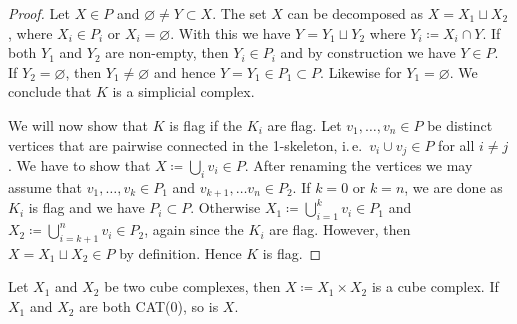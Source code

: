 \begin{proof}
  Let \(X \in P\) and \(\varnothing \neq Y \subset X\). The set \(X\) can be decomposed as \(X = X_1 \sqcup X_2\), where \(X_i \in P_i\) or \(X_i = \varnothing\). With this we have \(Y = Y_1 \sqcup Y_2\) where \(Y_i \coloneqq X_i \cap Y\). If both \(Y_1\) and \(Y_2\) are non-empty, then \(Y_i \in P_i\) and by construction we have \(Y \in P\). If \(Y_2 = \varnothing\), then \(Y_1 \neq \varnothing\) and hence \(Y = Y_1 \in P_1 \subset P\). Likewise for \(Y_1 = \varnothing\). We conclude that \(K\) is a simplicial complex.

  We will now show that \(K\) is flag if the \(K_i\) are flag. Let \(v_1, \dots, v_n \in P\) be distinct vertices that are pairwise connected in the 1-skeleton, i.\,e.\ \(v_i \cup v_j \in P\) for all \(i \neq j\). We have to show that \(X \coloneqq \bigcup_i v_i \in P\). After renaming the vertices we may assume that \(v_1, \dots, v_k \in P_1\) and \(v_{k+1}, \dots v_{n} \in P_2\). If \(k=0\) or \(k=n\), we are done as \(K_i\) is flag and we have \(P_i \subset P\). Otherwise \(X_1 \coloneqq \bigcup_{i=1}^kv_i \in P_1\) and \(X_2 \coloneqq \bigcup_{i=k+1}^n v_i \in P_2\), again since the \(K_i\) are flag. However, then \(X = X_1 \sqcup X_2 \in P\) by definition. Hence \(K\) is flag.
\end{proof}

\begin{prop}
  \label{prop:product-cat}
  Let \(X_1\) and \(X_2\) be two cube complexes, then \(X \coloneqq X_1 \times X_2\) is a cube complex. If \(X_1\) and \(X_2\) are both CAT(0), so is \(X\).
\end{prop}

